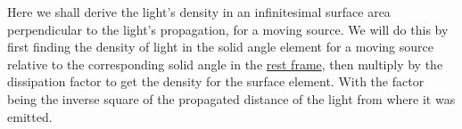 
Here we shall derive the light's density in an infinitesimal surface area perpendicular to the light's propagation, for a moving source.
We will do this by first finding the density of light in the solid angle element for a moving source relative to the corresponding solid angle in the \hyperlink{def-proper-frame}{rest frame}, then multiply by the dissipation factor to get the density for the surface element.
With the factor being the inverse square of the propagated distance of the light from where it was emitted.

